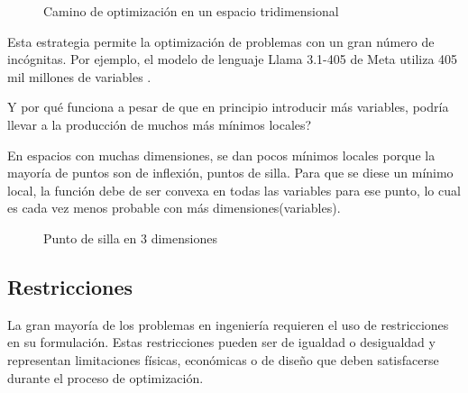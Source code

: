 \begin{figure}[h] \centering
	\caption{Camino de optimización en un espacio tridimensional}
	\label{fig:optimization_path}
\end{figure}

Esta estrategia permite la optimización de problemas con un gran número de
incógnitas. Por ejemplo, el modelo de lenguaje Llama 3.1-405 de Meta
utiliza 405 mil millones de variables \cite{dubey2024llama}.


Y por qué funciona a pesar de que en principio introducir más variables, podría llevar
a la producción de muchos más mínimos locales?

En espacios con muchas dimensiones, se dan pocos mínimos locales porque la mayoría
de puntos son de inflexión, puntos de silla.
Para que se diese un mínimo local, la función debe de ser convexa en todas las variables
para ese punto, lo cual es cada vez menos probable con más dimensiones(variables).

\begin{figure}[h] \centering
	\caption{Punto de silla en 3 dimensiones}
	\label{fig:inflexion_point}
\end{figure}


\subsection{Restricciones}

La gran mayoría de los problemas en ingeniería requieren el uso de
restricciones en su formulación. Estas restricciones pueden ser de igualdad o
desigualdad y representan limitaciones físicas, económicas o de diseño que
deben satisfacerse durante el proceso de optimización.

